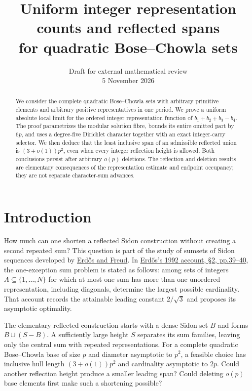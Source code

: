 \documentclass[11pt,a4paper]{article}
\title{Uniform integer representation counts and reflected spans\\
for quadratic Bose--Chowla sets}
\author{}
\date{Draft for external mathematical review\\5 November 2026}
\begin{document}
\maketitle
\begin{abstract}

We consider the complete quadratic Bose–Chowla sets with arbitrary
primitive elements and arbitrary positive representatives in one period.
We prove a uniform absolute local limit for the ordered integer
representation function of $b_1+b_2+b_3-b_4$. The proof parametrizes
the modular solution fibre, bounds its entire omitted part by $6p$,
and uses a degree-five Dirichlet character together with an exact
integer-carry selector. We then deduce that the least inclusive span
of an admissible reflected union is $(3+o(1))p^2$, even when every
integer reflection height is allowed. Both conclusions persist after
arbitrary $o(p)$ deletions. The reflection and deletion results are
elementary consequences of the representation estimate and endpoint
occupancy; they are not separate character-sum advances.

\end{abstract}

\section{Introduction}\label{introduction}

How much can one shorten a reflected Sidon construction without creating a second repeated sum? This question is part of the study of sumsets of Sidon sequences developed by \href{https://www.sciencedirect.com/science/article/pii/0022314X9190083N}{Erdős and Freud}. In \href{https://hrj.episciences.org/125/pdf}{Erdős's 1992 account, §2, pp.39--40}, the one-exception sum problem is stated as follows: among sets of integers \(A\subseteq\{1,\ldots,N\}\) for which at most one sum has more than one unordered representation, including diagonals, determine the largest possible cardinality. That account records the attainable leading constant \(2/\sqrt3\) and proposes its asymptotic optimality.

The elementary reflected construction starts with a dense Sidon set \(B\) and forms \(B\cup(S-B)\). A sufficiently large height \(S\) separates its sum families, leaving only the central sum with repeated representations. For a complete quadratic Bose--Chowla base of size \(p\) and diameter asymptotic to \(p^2\), a feasible choice has inclusive hull length \((3+o(1))p^2\) and cardinality asymptotic to \(2p\). Could another reflection height produce a smaller leading span? Could deleting \(o(p)\) base elements first make such a shortening possible?
\end{document}
